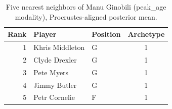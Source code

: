 \begin{table}[htbp]
  \centering\small
  \begin{tabular}{rllc}
    \toprule
    Rank & Player & Position & Archetype \\
    \midrule
    1 & Khris Middleton & G & 1 \\
    2 & Clyde Drexler & G & 1 \\
    3 & Pete Myers & G & 1 \\
    4 & Jimmy Butler & G & 1 \\
    5 & Petr Cornelie & F & 1 \\
    \bottomrule
  \end{tabular}
  \caption{Five nearest neighbors of Manu Ginobili (peak_age modality), Procrustes-aligned posterior mean.}
  \label{tab:Manu_Ginobili_neighbors_peak_age}
\end{table}

